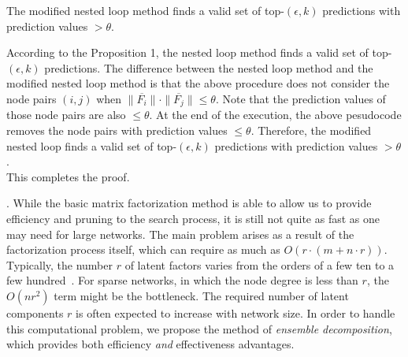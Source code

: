 {\begin{prop}
The modified nested loop method finds a valid set of top-$(\epsilon, k)$
predictions with prediction values $> \theta$.
\end{prop}
\begin{IEEEproof}
According to the Proposition 1, the nested loop method finds a valid set of
top-$(\epsilon, k)$ predictions. The difference between the nested loop method
and the modified nested loop method is that the above procedure does not consider
the node pairs $(i, j)$ when $\|\overline{F_i} \| \cdot \| \overline{F_j} \| \leq \theta$.
Note that the prediction values of those node pairs are also $\leq \theta$. At the end of
the execution, the above pesudocode removes the node pairs with prediction values $\leq \theta$.
Therefore, the modified nested loop finds a valid set of top-$(\epsilon, k)$ predictions with
prediction values $> \theta$.
\\
This completes the proof.
\end{IEEEproof} }


. While the basic matrix factorization method is able to allow us to provide
efficiency and pruning to the search process, it is still not quite
as fast as one may need for large networks. The main problem
arises as a result of the factorization process itself, which can
require as much as $O(r \cdot (m + n\cdot r))$.  Typically, the
number $r$ of latent factors varies from the orders of a few ten to a few hundred~\cite{NMF-nature99, NMF-www2010}. For
sparse networks, in which the node degree is less than $r$, the $O(n
r^2)$ term might be the bottleneck.  The required  number of latent
components $r$ is often expected to increase with network size. In
order to handle this computational problem, we propose the method of
{\em ensemble decomposition}, which provides both efficiency {\em
and} effectiveness advantages.
